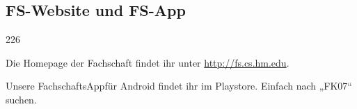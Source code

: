\subsection{FS-Website und FS-App}
\begin{dinglist}{226}
	\item Die Homepage der Fachschaft findet ihr unter \url{http://fs.cs.hm.edu}.
	\item Unsere FachschaftsAppfür Android findet ihr im Playstore. 
	Einfach nach „FK07“ suchen.
\end{dinglist}



